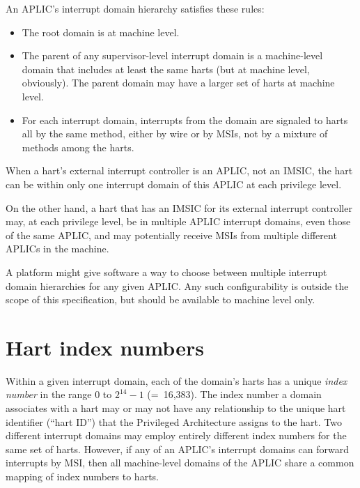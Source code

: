 An APLIC's interrupt domain hierarchy satisfies these rules:
\begin{itemize}

\item
The root domain is at machine level.

\item
The parent of any supervisor-level interrupt domain is a machine-level
domain that includes at least the same harts (but at machine level,
obviously).
The parent domain may have a larger set of harts at machine level.

\item
For each interrupt domain, interrupts from the domain are signaled
to harts all by the same method, either by wire or by MSIs, not by a
mixture of methods among the harts.

\end{itemize}

When a {\RISCV} hart's external interrupt controller is an APLIC, not an
IMSIC, the hart can be within only one interrupt domain of this APLIC at
each privilege level.

On the other hand, a hart that has an IMSIC for its external interrupt
controller may, at each privilege level, be in multiple APLIC interrupt
domains, even those of the same APLIC, and may potentially receive MSIs
from multiple different APLICs in the machine.

A platform might give software a way to choose between multiple
interrupt domain hierarchies for any given APLIC.
Any such configurability is outside the scope of this specification,
but should be available to machine level only.

\section{Hart index numbers}

Within a given interrupt domain, each of the domain's harts has a
unique \emph{index number} in the range 0 to ${\mbox{2}^{14}-\mbox{1}}$
(=~16,383).
The index number a domain associates with a hart may or may not have
any relationship to the unique hart identifier (``hart ID'') that the
{\RISCV} Privileged Architecture assigns to the hart.
Two different interrupt domains may employ entirely different index
numbers for the same set of harts.
However, if any of an APLIC's interrupt domains can forward interrupts by
MSI, then all machine-level domains of the APLIC share a common mapping
of index numbers to harts.

